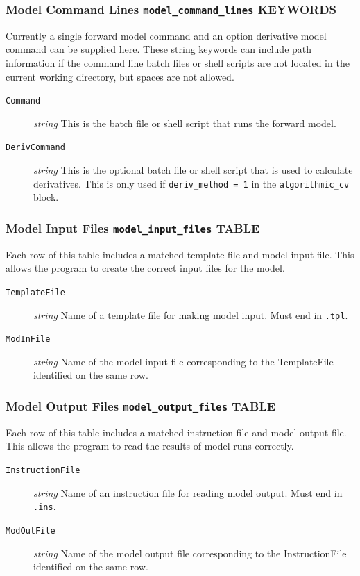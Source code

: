 \documentclass[11pt,oneside,onecolumn]{usgsreport}
\begin{document}
\begin{appendix}
\begin{bibunit}
\subsubsection{Model Command Lines \texttt{model\_command\_lines} KEYWORDS}

Currently a single forward model command and an option derivative
model command can be supplied here. These string keywords can include
path information if the command line batch files or shell scripts
are not located in the current working directory, but spaces are not
allowed.
\begin{description}
\item [{\texttt{Command}}] \emph{string} This is the batch file or shell
script that runs the forward model.
\item [{\texttt{DerivCommand}}] \emph{string} This is the optional batch
file or shell script that is used to calculate derivatives. This is
only used if \texttt{deriv\_method = 1} in the \texttt{algorithmic\_cv}
block.
\end{description}

\subsubsection{Model Input Files \texttt{model\_input\_files} TABLE}

Each row of this table includes a matched template file and model
input file. This allows the program to create the correct input files
for the model.
\begin{description}
\item [{\texttt{TemplateFile}}] \emph{string} Name of a template file for
making model input. Must end in \texttt{.tpl}.
\item [{\texttt{ModInFile}}] \emph{string} Name of the model input file
corresponding to the TemplateFile identified on the same row.
\end{description}

\subsubsection{Model Output Files \texttt{model\_output\_files} TABLE}

Each row of this table includes a matched instruction file and model
output file. This allows the program to read the results of model
runs correctly.
\begin{description}
\item [{\texttt{InstructionFile}}] \emph{string} Name of an instruction
file for reading model output. Must end in \texttt{.ins}.
\item [{\texttt{ModOutFile}}] \emph{string} Name of the model output file
corresponding to the InstructionFile identified on the same row.
\end{description}


\end{bibunit}
\end{appendix}
\end{document}

